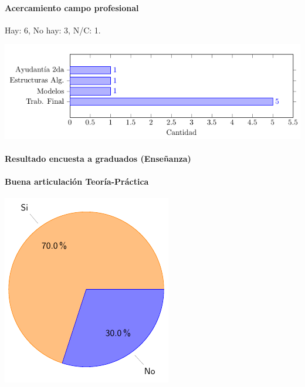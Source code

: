 \documentclass[a4paper,10pt,BCOR10mm,oneside,headsepline]{scrbook}
\begin{document}
\paragraph{Acercamiento campo profesional}

Hay: 6, No hay: 3,  N/C: 1.

\begin{center}
  \includegraphics[scale=.5]{barras3.png}
\end{center}


 






\paragraph{Resultado encuesta a graduados (Enseñanza)}
\paragraph{Buena articulación Teoría-Práctica}

\begin{center}
  \includegraphics[scale=.5]{torta4.png}
\end{center}


 
\end{document}
